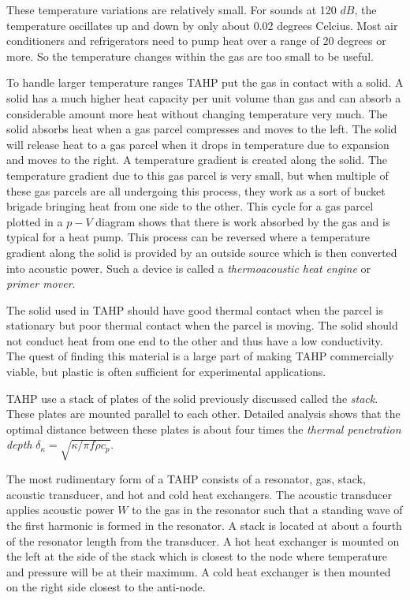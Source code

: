 \documentclass{article}
\begin{document}
These temperature variations are relatively small. For sounds at 120 \(dB\), the temperature oscillates up and down by only about 0.02 degrees Celcius. Most air conditioners and refrigerators need to pump heat over a range of 20 degrees or more. So the temperature changes within the gas are too small to be useful.

To handle larger temperature ranges TAHP put the gas in contact with a solid. A solid has a much higher heat capacity per unit volume than gas and can absorb a considerable amount more heat without changing temperature very much. The solid absorbs heat when a gas parcel compresses and moves to the left. The solid will release heat to a gas parcel when it drops in temperature due to expansion and moves to the right. A temperature gradient is created along the solid. The temperature gradient due to this gas parcel is very small, but when multiple of these gas parcels are all undergoing this process, they work as a sort of bucket brigade bringing heat from one side to the other. %
This cycle for a gas parcel plotted in a \(p-V\) diagram shows that there is work absorbed by the gas and is typical for a heat pump.  %
This process can be reversed where a temperature gradient along the solid is provided by an outside source which is then converted into acoustic power. Such a device is called a \emph{thermoacoustic heat engine} or \emph{primer mover}.

The solid used in TAHP should have good thermal contact when the parcel is stationary but poor thermal contact when the parcel is moving. The solid should not conduct heat from one end to the other and thus have a low conductivity. The quest of finding this material is a large part of making TAHP commercially viable, but plastic is often sufficient for experimental applications.

TAHP use a stack of plates of the solid previously discussed called the \emph{stack}. These plates are mounted parallel to each other. Detailed analysis shows that the optimal distance between these plates is about four times the \emph{thermal penetration depth} \(\delta_\kappa = \sqrt{\kappa/\pi f \rho c_p}\). %

The most rudimentary form of a TAHP consists of a resonator, gas, stack, acoustic transducer, and hot and cold heat exchangers. The acoustic transducer applies acoustic power \(W\) to the gas in the resonator such that a standing wave of the first harmonic is formed in the resonator. A stack is located at about a fourth of the resonator length from the transducer. A hot heat exchanger is mounted on the left at the side of the stack which is closest to the node where temperature and pressure will be at their maximum. A cold heat exchanger is then mounted on the right side closest to the anti-node.
\end{document}
